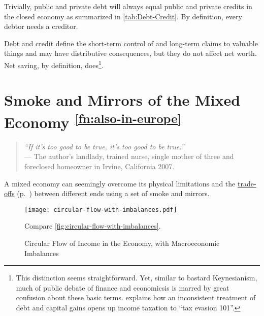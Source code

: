 \begin{enumerate}
	Trivially, public and private debt will always equal public and private credits in the closed economy as summarized in \autoref{tab:Debt-Credit}. By definition, every debtor needs a creditor. 
	
	Debt and credit define the short-term control of and long-term claims to valuable things and may have distributive consequences, but they do not affect net worth. Net saving, by definition, does\footnote{
		This distinction seems straightforward. Yet, similar to bastard Keynesianism, much of public debate of finance and economicsis is marred by great confusion about these basic terms. \citealt{McCaffery2005} explains how an inconsistent treatment of debt and capital gains opens up income taxation to ``tax evasion 101''.}.%
\end{enumerate}

\section[Smoke and Mirrors]{Smoke and Mirrors of the Mixed Economy \textsuperscript{\ref{fn:also-in-europe}}} \label{sec:smoke-n-mirrors}

\begin{quote}
	\emph{``If it's too good to be true, it's too good to be true.''\\}
	--- The author's landlady, trained nurse, single mother of three and foreclosed homeowner in Irvine, California 2007.
\end{quote}


A mixed economy can seemingly overcome its physical limitations and the \hyperref[sec:trade-offs]{trade-offs} (p.~\pageref{sec:trade-offs}) between different ends using a set of smoke and mirrors. 

\begin{figure}[htbp]
	\centering
	\texttt{[image: circular-flow-with-imbalances.pdf]}  
	\caption[Circular Flow in the Economy, with Imbalances]{Circular Flow of Income in the Economy, with Macroeconomic Imbalances}
	\begin{flushleft}
		\scriptsize{Compare \autoref{fig:circular-flow-with-imbalances}.}
	\end{flushleft}
	\label{fig:circular-flow-with-imbalances}
\end{figure}

